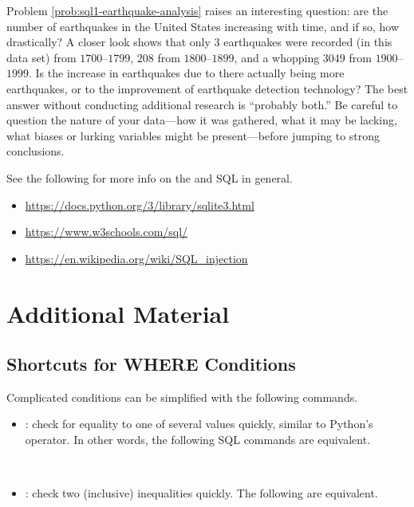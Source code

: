 \begin{info} %
Problem \ref{prob:sql1-earthquake-analysis} raises an interesting question: are the number of earthquakes in the United States increasing with time, and if so, how drastically?
A closer look shows that only $3$ earthquakes were recorded (in this data set) from $1700$--$1799$, $208$ from $1800$--$1899$, and a whopping $3049$ from $1900$--$1999$.
Is the increase in earthquakes due to there actually being more earthquakes, or to the improvement of earthquake detection technology?
The best answer without conducting additional research is ``probably both.''
Be careful to question the nature of your data---how it was gathered, what it may be lacking, what biases or lurking variables might be present---before jumping to strong conclusions.
\end{info}
%
See the following for more info on the  and SQL in general.
\begin{itemize}
    \item \url{https://docs.python.org/3/library/sqlite3.html}
    \item \url{https://www.w3schools.com/sql/}
    \item \url{https://en.wikipedia.org/wiki/SQL_injection}
\end{itemize}

\newpage

\section*{Additional Material} %

\subsection*{Shortcuts for WHERE Conditions}

Complicated  conditions can be simplified with the following commands.
\begin{itemize}
    \item {}: check for equality to one of several values quickly, similar to Python's  operator.
    In other words, the following SQL commands are equivalent.
    \begin{center}
        \\
    \end{center}

    \item {}: check two (inclusive) inequalities quickly.
    The following are equivalent.
    \begin{center}
        \\
    \end{center}
\end{itemize}

